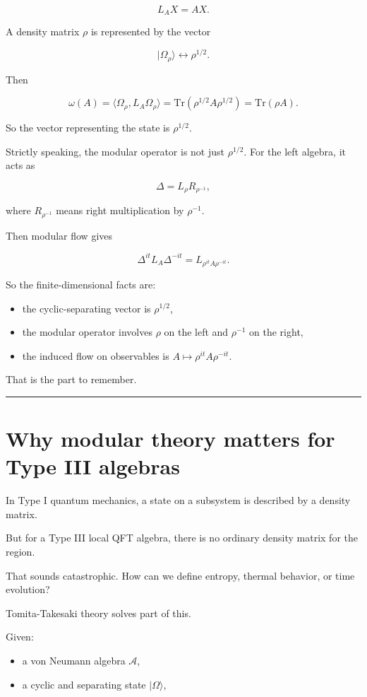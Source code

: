 \documentclass[11pt,a4paper]{article}
\begin{document}
\[
L_A X=AX.
\]

A density matrix $\rho$ is represented by the vector

\[
|\Omega_\rho\rangle \leftrightarrow \rho^{1/2}.
\]

Then

\[
\omega(A)=\langle \Omega_\rho,L_A\Omega_\rho\rangle
=
\mathrm{Tr}(\rho^{1/2}A\rho^{1/2})
=
\mathrm{Tr}(\rho A).
\]

So the vector representing the state is $\rho^{1/2}$.

Strictly speaking, the modular operator is not just $\rho^{1/2}$. For the left algebra, it acts as

\[
\Delta = L_\rho R_{\rho^{-1}},
\]

where $R_{\rho^{-1}}$ means right multiplication by $\rho^{-1}$.

Then modular flow gives

\[
\Delta^{it} L_A \Delta^{-it}
=
L_{\rho^{it}A\rho^{-it}}.
\]

So the finite-dimensional facts are:

\begin{itemize}
  \item the cyclic-separating vector is $\rho^{1/2}$,
  \item the modular operator involves $\rho$ on the left and $\rho^{-1}$ on the right,
  \item the induced flow on observables is $A\mapsto \rho^{it}A\rho^{-it}$.
\end{itemize}

That is the part to remember.

\medskip\hrule\medskip

\section{Why modular theory matters for Type III algebras}

In Type I quantum mechanics, a state on a subsystem is described by a density matrix.

But for a Type III local QFT algebra, there is no ordinary density matrix for the region.

That sounds catastrophic. How can we define entropy, thermal behavior, or time evolution?

Tomita-Takesaki theory solves part of this.

Given:

\begin{itemize}
  \item a von Neumann algebra $\mathcal{A}$,
  \item a cyclic and separating state $|\Omega\rangle$,
\end{itemize}
\end{document}

